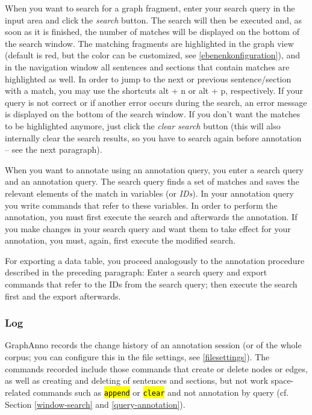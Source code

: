\documentclass[12pt]{scrartcl}
\newcommand{\code}[1]{\hl{\texttt{#1}}}
\begin{document}
When you want to search for a graph fragment, enter your search query in the input area and click the \textit{search} button.
The search will then be executed and, as soon as it is finished, the number of matches will be displayed on the bottom of the search window.
The matching fragments are highlighted in the graph view (default is red, but the color can be customized, see \ref{ebenenkonfiguration}), and in the navigation window all sentences and sections that contain matches are highlighted as well.
In order to jump to the next or previous sentence/section with a match, you may use the shortcuts alt + n or alt + p, respectively. 
If your query is not correct or if another error occurs during the search, an error message is displayed on the bottom of the search window.
If you don’t want the matches to be highlighted anymore, just click the \textit{clear search} button (this will also internally clear the search results, so you have to search again before annotation – see the next paragraph).

When you want to annotate using an annotation query, you enter a search query and an annotation query.
The search query finds a set of matches and saves the relevant elements of the match in variables (or \textit{IDs}).
In your annotation query you write commands that refer to these variables.
In order to perform the annotation, you must first execute the search and afterwards the annotation.
If you make changes in your search query and want them to take effect for your annotation, you must, again, first execute the modified search.

For exporting a data table, you proceed analogously to the annotation procedure described in the preceding paragraph:
Enter a search query and export commands that refer to the IDs from the search query; then execute the search first and the export afterwards.

\subsubsection{Log}\label{window-log}

GraphAnno records the change history of an annotation session (or of the whole corpus; you can configure this in the file settings, see \ref{filesettings}).
The commands recorded include those commands that create or delete nodes or edges, as well as creating and deleting of sentences and sections, but not work space-related commands such as \code{append} or \code{clear} and not annotation by query (cf. Section \ref{window-search} and \ref{query-annotation}).
\end{document}
